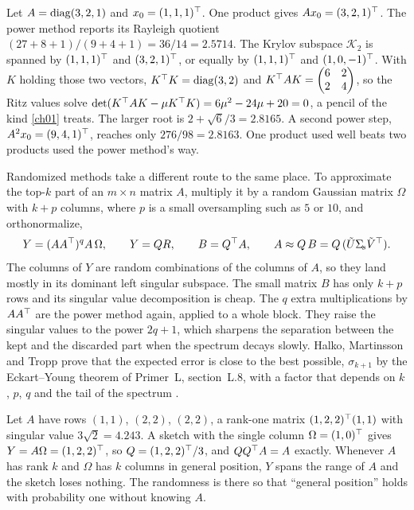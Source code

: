 \begin{example}\label{ex:ch13:krylov}
Let $A=\operatorname{diag}(3,2,1)$ and $x_0=(1,1,1)^{\top}$. One product gives $Ax_0=(3,2,1)^{\top}$. The
power method reports its Rayleigh quotient $(27+8+1)/(9+4+1)=36/14=2.5714$. The
Krylov subspace $\mathcal K_2$ is spanned by $(1,1,1)^{\top}$ and $(3,2,1)^{\top}$, or
equally by $(1,1,1)^{\top}$ and $(1,0,-1)^{\top}$. With $K$ holding those two vectors,
$K^{\top} K=\operatorname{diag}(3,2)$ and $K^{\top} AK=\begin{pmatrix}6&2\\2&4\end{pmatrix}$, so the Ritz
values solve $\det(K^{\top} AK-\mu K^{\top} K)=6\mu^2-24\mu+20=0$, a pencil of the kind
\cref{ch01} treats. The larger root is $2+\sqrt6/3=2.8165$. A second power step,
$A^2x_0=(9,4,1)^{\top}$, reaches only $276/98=2.8163$. One product used well beats
two products used the power method's way.
\end{example}

Randomized methods take a different route to the same place. To approximate the
top-$k$ part of an $m\times n$ matrix $A$, multiply it by a random Gaussian
matrix $\Omega$ with $k+p$ columns, where $p$ is a small oversampling such as $5$
or $10$, and orthonormalize,
\begin{equation}\label{eq:ch13:rsvd}
Y=(AA^{\top})^qA\,\Omega,\qquad Y=QR,\qquad B=Q^{\top} A,\qquad A\approx Q\,B=Q\,(\tilde U\Sigma_{\!s}\tilde V^{\top}).
\end{equation}
The columns of $Y$ are random combinations of the columns of $A$, so they land
mostly in its dominant left singular subspace. The small matrix $B$ has only
$k+p$ rows and its singular value decomposition is cheap. The $q$ extra
multiplications by $AA^{\top}$ are the power method again, applied to a whole block.
They raise the singular values to the power $2q+1$, which sharpens the
separation between the kept and the discarded part when the spectrum decays
slowly. Halko, Martinsson and Tropp prove that the expected error is close to the
best possible, $\sigma_{k+1}$ by the Eckart--Young theorem of Primer~L, section~L.8,
with a factor that depends on $k$, $p$, $q$ and the tail of the spectrum
\cite{halkomartinssontropp2011}.

\begin{example}\label{ex:ch13:sketch}
Let $A$ have rows $(1,1)$, $(2,2)$, $(2,2)$, a rank-one matrix
$(1,2,2)^{\top}(1,1)$ with singular value $3\sqrt2=4.243$. A sketch with the single
column $\Omega=(1,0)^{\top}$ gives $Y=A\Omega=(1,2,2)^{\top}$, so $Q=(1,2,2)^{\top}/3$, and
$QQ^{\top} A=A$ exactly. Whenever $A$ has rank $k$ and $\Omega$ has $k$ columns in
general position, $Y$ spans the range of $A$ and the sketch loses nothing. The
randomness is there so that ``general position'' holds with probability one
without knowing $A$.
\end{example}

